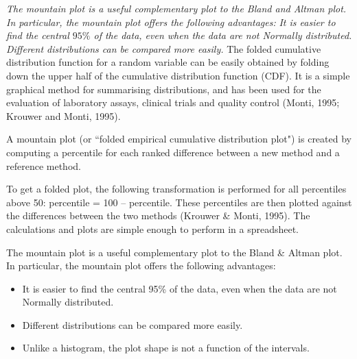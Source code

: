 \documentclass[Chap2main.tex]{subfiles}
\begin{document}
\emph{
	The mountain plot is a useful complementary plot to the Bland and Altman plot. In particular, the mountain plot offers the following advantages:}
\emph{
	It is easier to find the central $95\%$ of the data, even when the data are not Normally distributed.
	Different distributions can be compared more easily.
}
\newpage
The folded cumulative distribution function for a random variable can be easily obtained by folding down the upper half of the cumulative distribution
function (CDF). It is a simple graphical method for summarising distributions, and has been used for the evaluation of laboratory assays, clinical trials
and quality control (Monti, 1995; Krouwer and Monti, 1995).



A mountain plot (or ``folded empirical cumulative distribution plot") is created by computing a percentile for each ranked difference between a new method and a reference method. 

To get a folded plot, the following transformation is performed for all percentiles above 50: 
percentile = 100 – percentile. These percentiles are then plotted against the differences between 
the two methods (Krouwer \& Monti, 1995). The calculations and plots are simple enough to perform in a spreadsheet. 

The mountain plot is a useful complementary plot to the Bland \& Altman plot. 
In particular, the mountain plot offers the following advantages:
\begin{itemize}
	\item It is easier to find the central 95\% of the data, even when the data are not Normally distributed.
	\item Different distributions can be compared more easily.
	\item Unlike a histogram, the plot shape is not a function of the intervals. 
\end{itemize}

\end{document}

